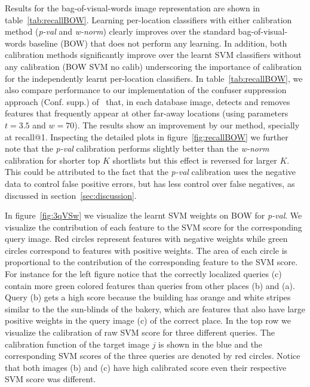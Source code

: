     Results for the bag-of-visual-words image representation are shown in table~\ref{tab:recallBOW}. %
    Learning per-location classifiers with either calibration method (\emph{p-val} and \emph{w-norm}) clearly improves over the standard bag-of-visual-words baseline (BOW) that does not perform any learning. In addition, both calibration methods significantly improve over the learnt SVM classifiers without any calibration (BOW SVM no calib) underscoring the importance of calibration for the independently learnt per-location classifiers.  
 \textcolor{petr}{
    In table~\ref{tab:recallBOW}, we also compare performance to our implementation of the confuser suppression approach (Conf. supp.) of~\cite{Knopp2010} that, in each database image, detects and removes features that frequently appear at other far-away locations (using parameters $t=3.5$ and $w=70$). The results show an improvement by our method, specially at recall@1.
    } 
    Inspecting the detailed plots in figure~\ref{fig:recallBOW} we further note that the  \emph{p-val} calibration performs slightly better than the \emph{w-norm} calibration for shorter top $K$ shortlists but this effect is reversed for larger $K$. This could be attributed to the fact that the \emph{p-val} calibration uses the negative data to control false positive errors, but has less control over false negatives, as discussed in section~\ref{sec:discussion}. 

    In figure~\ref{fig:3qVSw} we visualize the learnt SVM weights on BOW for \emph{p-val}. We visualize the contribution of each feature to the SVM score for the corresponding query image. Red circles represent features with negative weights while green circles correspond to features with positive weights. The area of each circle is proportional to the contribution of the corresponding feature to the SVM score. For instance for the left figure notice that the correctly localized queries (c) contain more green colored features than queries from other places (b) and (a). Query (b) gets a high score because the building has orange and white stripes similar to the the sun-blinds of the bakery, which are features that also have large positive weights in the query image (c) of the correct place.
    In the top row we visualize the calibration of raw SVM score for three different queries. The calibration function of the target image $j$ is shown in the blue and the corresponding SVM scores of the three queries are denoted by red circles. Notice that both images (b) and (c) have high calibrated score even their respective SVM score was different.     
    
